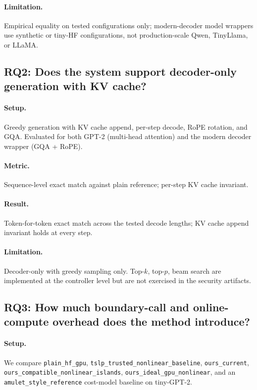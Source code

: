 \paragraph{Limitation.} Empirical equality on tested configurations only; modern-decoder model wrappers use synthetic or tiny-HF configurations, not production-scale Qwen, TinyLlama, or LLaMA.

\subsection{RQ2: Does the system support decoder-only generation with KV cache?}
\label{sec:eval:rq2}
\paragraph{Setup.} Greedy generation with KV cache append, per-step decode, RoPE rotation, and GQA. Evaluated for both GPT-2 (multi-head attention) and the modern decoder wrapper (GQA + RoPE).

\paragraph{Metric.} Sequence-level exact match against plain reference; per-step KV cache invariant.

\paragraph{Result.} Token-for-token exact match across the tested decode lengths; KV cache append invariant holds at every step.

\paragraph{Limitation.} Decoder-only with greedy sampling only. Top-$k$, top-$p$, beam search are implemented at the controller level but are not exercised in the security artifacts.

\subsection{RQ3: How much boundary-call and online-compute overhead does the method introduce?}
\label{sec:eval:rq3}
\paragraph{Setup.}
We compare \texttt{plain\_hf\_gpu}, \texttt{tslp\_trusted\_nonlinear\_baseline}, \texttt{ours\_current}, \texttt{ours\_compatible\_nonlinear\_islands}, \texttt{ours\_ideal\_gpu\_nonlinear}, and an \texttt{amulet\_style\_reference} cost-model baseline on tiny-GPT-2.

